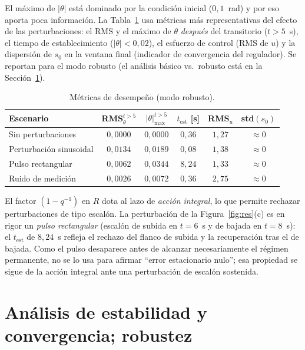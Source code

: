 \documentclass[a4paper,11pt]{report}
\begin{document}
El máximo de $|\theta|$ está dominado por la condición inicial ($0{,}1$~rad) y
por eso aporta poca información. La Tabla~\ref{tab:met} usa métricas más
representativas del efecto de las perturbaciones: el RMS y el máximo de $\theta$
\emph{después} del transitorio ($t>5$~s), el tiempo de establecimiento
($|\theta|<0{,}02$), el esfuerzo de control (RMS de $u$) y la dispersión de
$s_0$ en la ventana final (indicador de convergencia del regulador). Se reportan
para el modo robusto (el análisis básico vs.\ robusto está en la
Sección~\ref{sec:robustez}).

\begin{table}[H]
\centering
\caption{Métricas de desempeño (modo robusto).}
\label{tab:met}
\begin{tabular}{@{}lccccc@{}}
\toprule
Escenario & RMS$_\theta^{t>5}$ & $|\theta|_{\max}^{t>5}$ & $t_{\text{est}}$ [s]
 & RMS$_u$ & std$(s_0)$ \\
\midrule
Sin perturbaciones      & $0{,}0000$ & $0{,}0000$ & $0{,}36$ & $1{,}27$ & $\approx 0$ \\
Perturbación sinusoidal & $0{,}0134$ & $0{,}0189$ & $0{,}08$ & $1{,}38$ & $\approx 0$ \\
Pulso rectangular       & $0{,}0062$ & $0{,}0344$ & $8{,}24$ & $1{,}33$ & $\approx 0$ \\
Ruido de medición       & $0{,}0026$ & $0{,}0072$ & $0{,}36$ & $2{,}75$ & $\approx 0$ \\
\bottomrule
\end{tabular}
\end{table}

El factor $(1-q^{-1})$ en $R$ dota al lazo de \emph{acción integral}, lo que
permite rechazar perturbaciones de tipo escalón. La perturbación de la
Figura~\ref{fig:res}(c) es en rigor un \emph{pulso rectangular}
(escalón de subida en $t=6$~s y de bajada en $t=8$~s): el $t_{\text{est}}$
de $8{,}24$~s refleja el rechazo del flanco de subida y la recuperación tras el
de bajada. Como el pulso desaparece antes de alcanzar necesariamente el régimen
permanente, no se lo usa para afirmar ``error estacionario nulo''; esa propiedad
se sigue de la acción integral ante una perturbación de escalón sostenida.

\section{Análisis de estabilidad y convergencia; robustez}
\label{sec:robustez}
\end{document}
